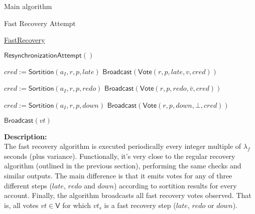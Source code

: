 \documentclass[10pt,a4paper]{article}
\begin{document}
\begin{section}{Main algorithm}
\begin{subsection}{Fast Recovery Attempt}\label{ssect:FastRecovery}

    \begin{algorithm}[H]
        \caption{\underline{FastRecovery}}
        \label{algo:fast-recovery}
        \begin{algorithmic}[1]


        \State $\mathsf{ResynchronizationAttempt}()$
    
                \State $cred := \mathsf{Sortition}(a_{I}, r,p,late)$
                    \State $\mathsf{Broadcast}(\mathsf{Vote}(r, p, late, v, cred))$
                \EndIf

                    \State $cred := 
                    \mathsf{Sortition}(a_{I},r,p, redo)$
                        \State $\mathsf{Broadcast}(\mathsf{Vote}(r,p,redo,\bar{v}, cred))$
                    \EndIf

            \Else
                \State $cred := 
                \mathsf{Sortition}(a_{I}, r,p, down)$
                    \State $\mathsf{Broadcast}(\mathsf{Vote}(r,p,down,\bot, cred))$
                \EndIf
            \EndIf
        \EndFor

            \State $\mathsf{Broadcast}(vt)$
        \EndFor

        \EndFunction
        \end{algorithmic}
    \end{algorithm}
    
    \noindent \textbf{Description:}\\
    The fast recovery algorithm is executed periodically every integer multiple of $\lambda_f$
    seconds (plus variance).
    Functionally, it's very close to the regular recovery algorithm (outlined in the previous section), 
    performing the same checks and similar outputs. The main difference is that it emits votes 
    for any of three different steps ($late$, $redo$ and $down$) according to sortition 
    results for every account.
    Finally, the algorithm broadcasts all fast recovery votes observed. That is, all votes $vt \in \mathsf{V}$ for which
    $vt_s$ is a fast recovery step ($late$, $redo$ or $down$).
\end{subsection}


\end{section}
\end{document}
